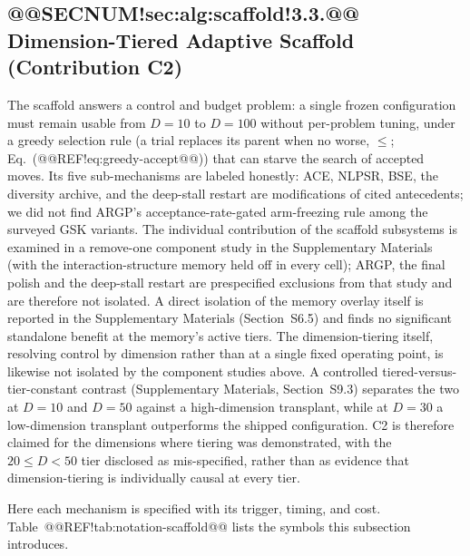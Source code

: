 \documentclass[10pt,a4paper]{article}
\begin{document}
\subsection{@@SECNUM!sec:alg:scaffold!3.3.@@ Dimension-Tiered Adaptive Scaffold (Contribution C2)}\label{sec:alg:scaffold}


The scaffold answers a control and budget problem: a single frozen
configuration must remain usable from $D=10$ to $D=100$ without
per-problem tuning, under a greedy selection rule (a trial replaces its
parent when no worse, $\le$; Eq.~(@@REF!eq:greedy-accept@@)) that can
starve the search of accepted moves.
Its five sub-mechanisms are labeled honestly: ACE, NLPSR, BSE, the
diversity archive, and the deep-stall restart are modifications of cited
antecedents; we did not find ARGP's acceptance-rate-gated arm-freezing
rule among the surveyed GSK variants.
The individual contribution of the scaffold subsystems is examined in a
remove-one component study in the Supplementary Materials (with
the interaction-structure memory held off in every cell); ARGP, the final
polish and the deep-stall restart are prespecified exclusions from that study
and are therefore not isolated. A direct isolation
of the memory overlay itself is reported in the Supplementary Materials
(Section~S6.5) and finds no significant standalone benefit at the
memory's active tiers. The dimension-tiering itself, resolving control
by dimension rather than at a single fixed operating point, is likewise
not isolated by the component studies above. A controlled
tiered-versus-tier-constant contrast (Supplementary Materials,
Section~S9.3) separates the
two at $D = 10$ and $D = 50$ against a high-dimension transplant, while at
$D = 30$ a low-dimension transplant outperforms the shipped configuration. C2 is
therefore claimed for the dimensions where tiering was demonstrated, with the
$20 \leq D < 50$ tier disclosed as mis-specified, rather than as evidence that
dimension-tiering is individually causal at every tier.

Here each mechanism is specified with its trigger,
timing, and cost. Table~@@REF!tab:notation-scaffold@@ lists the symbols this
subsection introduces.
\end{document}
